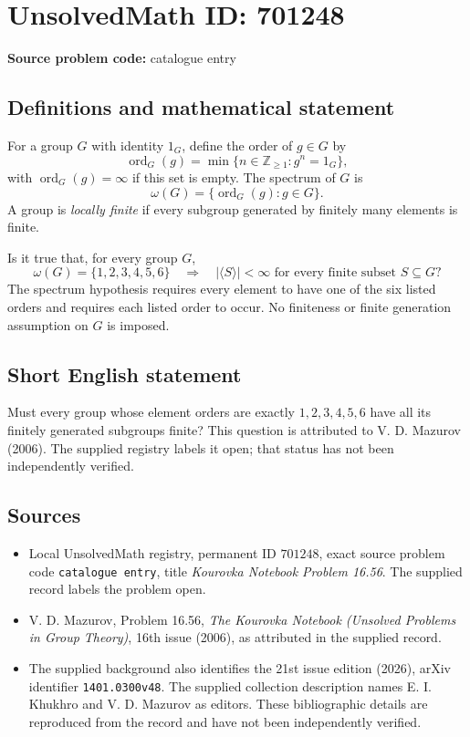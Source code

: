 \documentclass[11pt]{article}
\newcommand{\Z}{\mathbb{Z}}
\begin{document}
\section*{UnsolvedMath ID: 701248}
\textbf{Source problem code:} catalogue entry
\subsection{Definitions and mathematical statement}
For a group \(G\) with identity \(1_G\), define the order of \(g\in G\) by
\[
\operatorname{ord}_G(g)=\min\{n\in\Z_{\geq 1}:g^n=1_G\},
\]
with \(\operatorname{ord}_G(g)=\infty\) if this set is empty. The spectrum of \(G\) is
\[
\omega(G)=\{\operatorname{ord}_G(g):g\in G\}.
\]
A group is \emph{locally finite} if every subgroup generated by finitely many elements is finite.

Is it true that, for every group \(G\),
\[
\omega(G)=\{1,2,3,4,5,6\}
\quad\Longrightarrow\quad
|\langle S\rangle|<\infty\text{ for every finite subset }S\subseteq G?
\]
The spectrum hypothesis requires every element to have one of the six listed orders and requires each listed order to occur. No finiteness or finite generation assumption on \(G\) is imposed.
\subsection{Short English statement}
Must every group whose element orders are exactly \(1,2,3,4,5,6\) have all its finitely generated subgroups finite? This question is attributed to V. D. Mazurov (2006). The supplied registry labels it open; that status has not been independently verified.
\subsection{Sources}
\begin{itemize}
\item Local UnsolvedMath registry, permanent ID \(701248\), exact source problem code \texttt{catalogue entry}, title \emph{Kourovka Notebook Problem 16.56}. The supplied record labels the problem open.
\item V. D. Mazurov, Problem 16.56, \emph{The Kourovka Notebook (Unsolved Problems in Group Theory)}, 16th issue (2006), as attributed in the supplied record.
\item The supplied background also identifies the 21st issue edition (2026), arXiv identifier \texttt{1401.0300v48}. The supplied collection description names E. I. Khukhro and V. D. Mazurov as editors. These bibliographic details are reproduced from the record and have not been independently verified.
\end{itemize}
\end{document}
